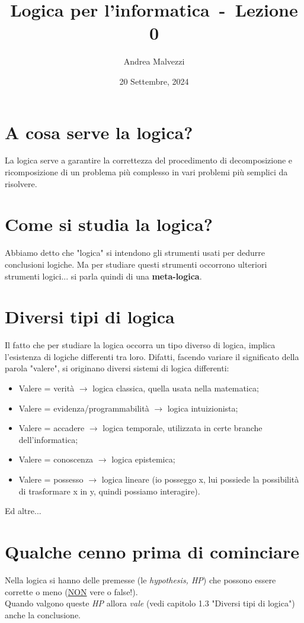\documentclass[12pt]{article}
\author{Andrea Malvezzi}
\title{\textbf{Logica per l'informatica~-~Lezione 0}}
\date{20 Settembre, 2024}
\begin{document}
\maketitle
\pagebreak
\tableofcontents
\pagebreak
\section{A cosa serve la logica?}
La logica serve a garantire la correttezza del procedimento di decomposizione e ricomposizione di un problema più complesso in vari problemi più semplici da risolvere.
\section{Come si studia la logica?}
Abbiamo detto che "logica" si intendono gli strumenti usati per dedurre conclusioni logiche. Ma per studiare questi strumenti occorrono ulteriori strumenti logici... si parla quindi di una \textbf{meta-logica}.
\section{Diversi tipi di logica}
Il fatto che per studiare la logica occorra un tipo diverso di logica, implica l'esistenza di logiche differenti tra loro. Difatti, facendo variare il significato della parola "valere", si originano diversi sistemi di logica differenti: 
\begin{itemize}
    \item Valere = verità $\rightarrow$ logica classica, quella usata nella matematica;
    \item Valere = evidenza/programmabilità $\rightarrow$ logica intuizionista;
    \item Valere = accadere $\rightarrow$ logica temporale, utilizzata in certe branche dell'informatica;
    \item Valere = conoscenza $\rightarrow$ logica epistemica;
    \item Valere = possesso $\rightarrow$ logica lineare (io posseggo x, lui possiede la possibilità di trasformare x in y, quindi possiamo interagire).
\end{itemize}
Ed altre...
\section{Qualche cenno prima di cominciare}
Nella logica si hanno delle premesse (le \textit{hypothesis, HP}) che possono essere corrette o meno (\underline{NON} vere o false!).\\
Quando valgono queste \textit{HP} allora \textit{vale} (vedi capitolo 1.3 "Diversi tipi di logica") anche la conclusione.\\
\end{document}
